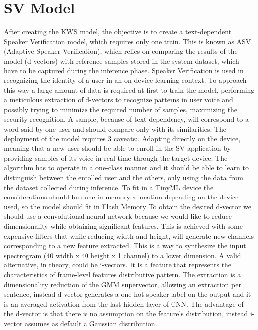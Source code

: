 \section{SV Model}
\label{sec:sv introduction}
After creating the KWS model, the objective is to create a text-dependent Speaker Verification model, which requires only one train. This is known as ASV (Adaptive Speaker Verification), which relies on comparing the results of the model (d-vectors) with reference samples stored in the system dataset, which have to be captured during the inference phase. Speaker Verification is used in recognizing the identity of a user in an on-device learning context. To approach this way a large amount of data is required at first to train the model, performing a meticulous extraction of d-vectors to recognize patterns in user voice and possibly trying to minimize the required number of samples, maximizing the security recognition. A sample, because of text dependency, will correspond to a word said by one user and should compare only with its similarities.\newline
The deployment of the model requires 3 caveats:. Adapting directly on the device, meaning that a new user should be able to enroll in the SV application by providing samples of its voice in real-time through the target device. The algorithm has to operate in a one-class manner and it should be able to learn to distinguish between the enrolled user and the others, only using the data from the dataset collected during inference. To fit in a TinyML device the considerations should be done in memory allocation depending on the device used, so the model should fit in Flash Memory\newline
To obtain the desired d-vector we should use a convolutional neural network because we would like to reduce dimensionality while obtaining significant features. This is achieved with some expensive filters that while reducing width and height, will generate new channels corresponding to a new feature extracted. This is a way to synthesize the input spectrogram (40 width x 40 height x 1 channel) to a lower dimension.\newline
A valid alternative, in theory, could be i-vectors. It is a feature that represents the characteristics of frame-level features distributive pattern. The extraction is a dimensionality reduction of the GMM supervector, allowing an extraction per sentence, instead d-vector generates a one-hot speaker label on the output and it is an averaged activation from the last hidden layer of CNN. The advantage of the d-vector is that there is no assumption on the feature's distribution, instead i-vector assumes as default a Gaussian distribution.
